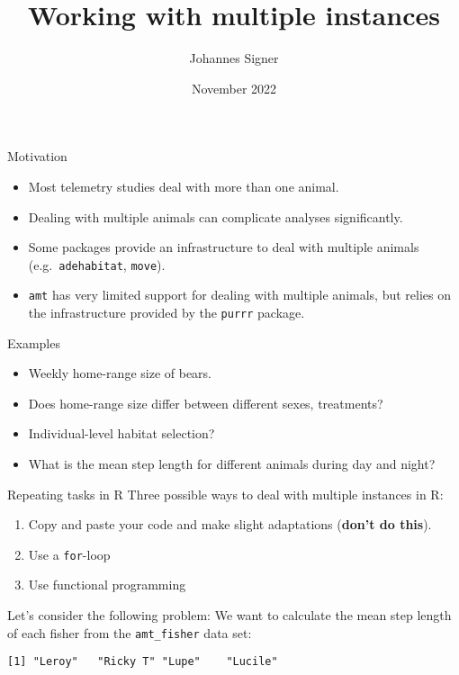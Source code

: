 \documentclass[ignorenonframetext,,t]{beamer}
\title{Working with multiple instances}
\author{Johannes Signer}
\date{November 2022}
\let\oldtextbf\textbf
\renewcommand{\textbf}[1]{\textcolor{spamwell}{\oldtextbf{#1}}}
\providecommand{\tightlist}{%
\setlength{\itemsep}{0pt}\setlength{\parskip}{0pt}}
\newenvironment{Shaded}{\begin{snugshade}}{\end{snugshade}}
\newcommand{\FunctionTok}[1]{\textcolor[rgb]{0.00,0.00,0.00}{#1}}
\newcommand{\NormalTok}[1]{#1}
\newcommand{\SpecialCharTok}[1]{\textcolor[rgb]{0.00,0.00,0.00}{#1}}
\providecommand{\tightlist}{%
\setlength{\itemsep}{0pt}\setlength{\parskip}{0pt}}
\renewcommand{\tightlist}{\setlength{\itemsep}{1.4ex}\setlength{\parskip}{0pt}}
\begin{document}
\frame{\titlepage}



\begin{frame}[fragile]{Motivation}
\protect\hypertarget{motivation}{}
\begin{itemize}
\tightlist
\item
  Most telemetry studies deal with more than one animal.
\item
  Dealing with multiple animals can complicate analyses significantly.
\item
  Some packages provide an infrastructure to deal with multiple animals
  (e.g.~\texttt{adehabitat}, \texttt{move}).
\item
  \texttt{amt} has very limited support for dealing with multiple
  animals, but relies on the infrastructure provided by the
  \texttt{purrr} package.
\end{itemize}
\end{frame}

\begin{frame}{Examples}
\protect\hypertarget{examples}{}
\begin{itemize}
\tightlist
\item
  Weekly home-range size of bears.
\item
  Does home-range size differ between different sexes, treatments?
\item
  Individual-level habitat selection?
\item
  What is the mean step length for different animals during day and
  night?
\end{itemize}
\end{frame}

\begin{frame}[fragile]{Repeating tasks in R}
\protect\hypertarget{repeating-tasks-in-r}{}
Three possible ways to deal with multiple instances in R:

\begin{enumerate}
\tightlist
\item
  Copy and paste your code and make slight adaptations (\textbf{don't do
  this}).
\item
  Use a \texttt{for}-loop
\item
  Use functional programming
\end{enumerate}
\end{frame}

\begin{frame}[fragile]
Let's consider the following problem: We want to calculate the mean step
length of each fisher from the \texttt{amt\_fisher} data set:

\begin{Shaded}
\end{Shaded}

\begin{verbatim}
[1] "Leroy"   "Ricky T" "Lupe"    "Lucile" 
\end{verbatim}
\end{frame}
\end{document}
